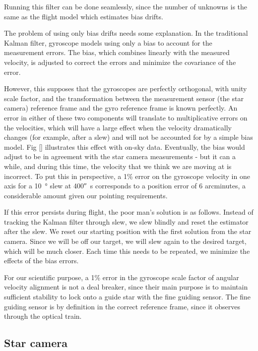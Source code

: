 Running this filter can be done seamlessly, since the number of unknowns is the same as the flight model which estimates bias drifts. 

The problem of using only bias drifts needs some explanation. In the traditional Kalman filter, gyroscope models using only a bias to account for the measurement errors. The bias, which combines linearly with the measured velocity, is adjusted to correct the errors and minimize the covariance of the error.

However, this supposes that the gyroscopes are perfectly orthogonal, with unity scale factor, and the transformation between the measurement sensor (the star camera) reference frame and the gyro reference frame is known perfectly. An error in either of these two components will translate to multiplicative errors on the velocities, which will have a large effect when the velocity dramatically changes (for example, after a slew) and will not be accounted for by a simple bias model. Fig [] illustrates this effect with on-sky data. Eventually, the bias would adjust to be in agreement with the star camera measurements - but it can a while, and during this time, the velocity that we think we are moving at is incorrect. To put this in perspective, a 1\% error on the gyroscope velocity in one axis for a \SI{10}{\degree} slew at \ang{;;400}\si{\per\second} corresponds to a position error of 6 arcminutes, a considerable amount given our pointing requirements.

If this error persists during flight, the poor man's solution is as follows. Instead of tracking the Kalman filter through slew, we slew blindly and reset the estimator after the slew. We reset our starting position with the first solution from the star camera. Since we will be off our target, we will slew again to the desired target, which will be much closer. Each time this needs to be repeated, we minimize the effects of the bias errors.

For our scientific purpose, a 1\% error in the gyroscope scale factor of angular velocity alignment is not a deal breaker, since their main purpose is to maintain sufficient stability to lock onto a guide star with the fine guiding sensor. The fine guiding sensor is by definition in the correct reference frame, since it observes through the optical train. 






\subsection{Star camera}

